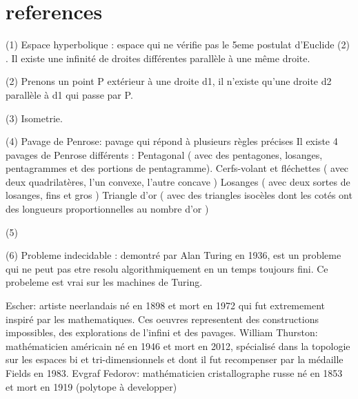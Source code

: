 \documentclass{article}
\begin{document}
\section{references}

 (1)	Espace hyperbolique : espace qui ne vérifie pas le 5eme postulat d’Euclide (2) . Il existe une infinité de droites différentes parallèle à une même droite.

(2)	Prenons un point  P extérieur à une droite d1, il n’existe qu’une droite d2 parallèle à d1 qui passe par P.

(3)	Isometrie.

(4)	Pavage de Penrose: pavage qui répond à plusieurs règles précises Il existe 4 pavages de Penrose différents :
Pentagonal ( avec des pentagones, losanges, pentagrammes et des portions de pentagramme).
Cerfs-volant et fléchettes ( avec deux quadrilatères, l'un convexe, l'autre concave )
Losanges ( avec deux sortes de losanges, fins et gros )
Triangle d’or ( avec des triangles isocèles dont les cotés ont des longueurs proportionnelles au nombre d’or )

(5)

(6)	Probleme indecidable : demontré par Alan Turing en 1936, est un probleme qui ne peut pas etre resolu algorithmiquement en un temps toujours fini. Ce probeleme est vrai sur les machines de Turing.

Escher: artiste neerlandais né en 1898 et mort en 1972 qui fut extremement inspiré par les mathematiques. Ces oeuvres representent des constructions impossibles, des explorations de l'infini et des pavages.
William Thurston: mathématicien américain né en 1946 et mort en 2012, spécialisé dans la topologie sur les espaces bi et tri-dimensionnels et dont il fut recompenser par la médaille Fields en 1983.
Evgraf Fedorov: mathématicien cristallographe russe né en 1853 et mort en 1919 (polytope à developper)


\nocite{*}

\end{document}
